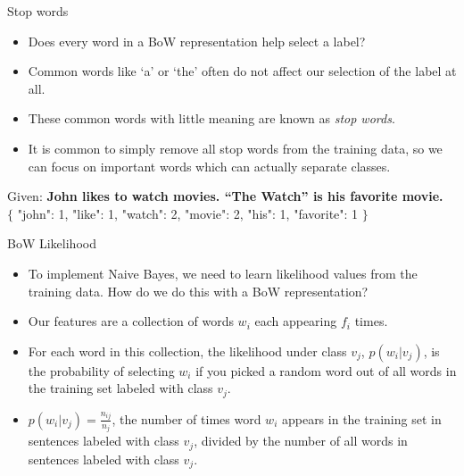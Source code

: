 \documentclass[aspectratio=169, 10pt]{beamer}
\begin{document}
\begin{frame}{Stop words}
    \begin{itemize}
        \item Does every word in a BoW representation help select a label?
        \item Common words like `a' or `the' often do not affect our selection of the label at all.
        \item These common words with little meaning are known as \textit{stop words}.
        \item It is common to simply remove all stop words from the training data, so we can focus on important words which can actually separate classes.
    \end{itemize}

    \pause
    \vspace{1em}
    Given: \textbf{John likes to watch movies. ``The Watch'' is his favorite movie.} \\
    $\{$ "john": 1, "like": 1, "watch": 2, "movie": 2, "his": 1, "favorite": 1 $\}$
\end{frame}

\begin{frame}{BoW Likelihood}
    \begin{itemize}
        \item To implement Naive Bayes, we need to learn likelihood values from the training data. How do we do this with a BoW representation?
        \item Our features are a collection of words $w_i$ each  appearing $f_i$ times.
        \item For each word in this collection, the likelihood under class $v_j$, $p(w_i|v_j)$, is the probability of  selecting $w_i$ if you picked a random word out of all words in the training set labeled with class $v_j$.
        \item $p(w_i|v_j) = \frac{n_{ij}}{n_j}$, the number of times word $w_i$ appears in the training set in sentences labeled with class $v_j$, divided by the number of all words in sentences labeled with class $v_j$.
    \end{itemize}
\end{frame}
\end{document}
